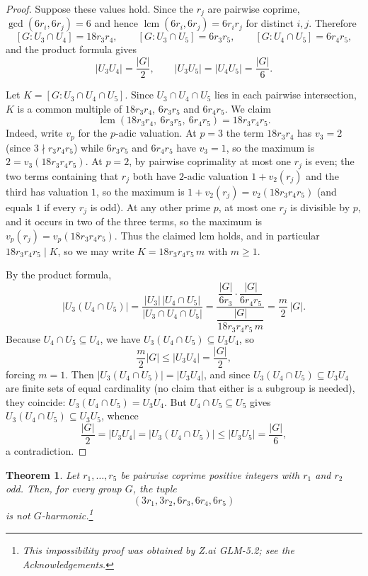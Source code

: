 \documentclass[12pt]{article}
\newtheorem{theorem}{Theorem}[section]
\theoremstyle{remark}
\newcommand{\lcm}{\operatorname{lcm}}
\begin{document}
\begin{proof}
Suppose these values hold. Since the $r_j$ are pairwise coprime, $\gcd(6r_i,6r_j)=6$ and hence $\lcm(6r_i,6r_j)=6r_ir_j$ for distinct $i,j$. Therefore
\[
[G:U_3\cap U_4]=18r_3r_4,\qquad
[G:U_3\cap U_5]=6r_3r_5,\qquad
[G:U_4\cap U_5]=6r_4r_5,
\]
and the product formula gives
\[
|U_3U_4|=\frac{|G|}{2},\qquad |U_3U_5|=|U_4U_5|=\frac{|G|}{6}.
\]

Let $K=[G:U_3\cap U_4\cap U_5]$. Since $U_3\cap U_4\cap U_5$ lies in each pairwise intersection, $K$ is a common multiple of $18r_3r_4$, $6r_3r_5$ and $6r_4r_5$. We claim
\[
\lcm(18r_3r_4,\ 6r_3r_5,\ 6r_4r_5)=18r_3r_4r_5.
\]
Indeed, write $v_p$ for the $p$-adic valuation. At $p=3$ the term $18r_3r_4$ has $v_3=2$ (since $3\nmid r_3r_4r_5$) while $6r_3r_5$ and $6r_4r_5$ have $v_3=1$, so the maximum is $2=v_3(18r_3r_4r_5)$. At $p=2$, by pairwise coprimality at most one $r_j$ is even; the two terms containing that $r_j$ both have $2$-adic valuation $1+v_2(r_j)$ and the third has valuation $1$, so the maximum is $1+v_2(r_j)=v_2(18r_3r_4r_5)$ (and equals $1$ if every $r_j$ is odd). At any other prime $p$, at most one $r_j$ is divisible by $p$, and it occurs in two of the three terms, so the maximum is $v_p(r_j)=v_p(18r_3r_4r_5)$. Thus the claimed lcm holds, and in particular $18r_3r_4r_5 \mid K$, so we may write $K=18r_3r_4r_5\,m$ with $m\ge 1$.

By the product formula,
\[
|U_3(U_4\cap U_5)|
=\frac{|U_3|\,|U_4\cap U_5|}{|U_3\cap U_4\cap U_5|}
=\frac{\dfrac{|G|}{6r_3}\cdot\dfrac{|G|}{6r_4r_5}}{\dfrac{|G|}{18r_3r_4r_5\,m}}
=\frac{m}{2}\,|G|.
\]
Because $U_4\cap U_5\subseteq U_4$, we have $U_3(U_4\cap U_5)\subseteq U_3U_4$, so
\[
\frac{m}{2}|G| \le |U_3U_4|=\frac{|G|}{2},
\]
forcing $m=1$. Then $|U_3(U_4\cap U_5)|=|U_3U_4|$, and since $U_3(U_4\cap U_5)\subseteq U_3U_4$ are finite sets of equal cardinality (no claim that either is a subgroup is needed), they coincide: $U_3(U_4\cap U_5)=U_3U_4$. But $U_4\cap U_5\subseteq U_5$ gives $U_3(U_4\cap U_5)\subseteq U_3U_5$, whence
\[
\frac{|G|}{2}=|U_3U_4|=|U_3(U_4\cap U_5)|\le |U_3U_5|=\frac{|G|}{6},
\]
a contradiction.
\end{proof}

\begin{theorem}\label{thm:MS46impossible}
Let $r_1,\ldots,r_5$ be pairwise coprime positive integers with $r_1$ and $r_2$ odd. Then, for every group $G$, the tuple
\[
(3r_1,3r_2,6r_3,6r_4,6r_5)
\]
is not $G$-harmonic.\footnote{This impossibility proof was obtained by Z.ai GLM-5.2; see the Acknowledgements.}
\end{theorem}
\end{document}
